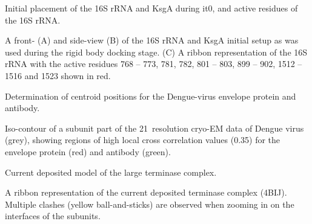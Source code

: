 \caption{Initial placement of the 16S rRNA and KsgA during it0, and active
residues of the 16S rRNA.}
{A front- (A) and side-view (B) of the 16S rRNA and
KsgA initial setup as was used during the rigid body docking stage. 
(C) A ribbon representation of the 16S rRNA with the active residues 768 – 773,
781, 782, 801 – 803, 899 – 902, 1512 – 1516 and 1523 shown in red.}
\stopbuffer

\caption{Determination of centroid positions for the Dengue-virus envelope
protein and antibody.}
{Iso-contour of a subunit part of the 21\Angstrom\ resolution cryo-EM data of
Dengue virus (grey), showing regions of high local cross correlation values
(0.35) for the envelope protein (red) and antibody (green).} 
\stopbuffer

\caption{Current deposited model of the large terminase complex.}
{A ribbon representation of the current deposited terminase complex (4BIJ).
Multiple clashes (yellow ball-and-sticks) are observed when zooming in on the
interfaces of the subunits.}
\stopbuffer
